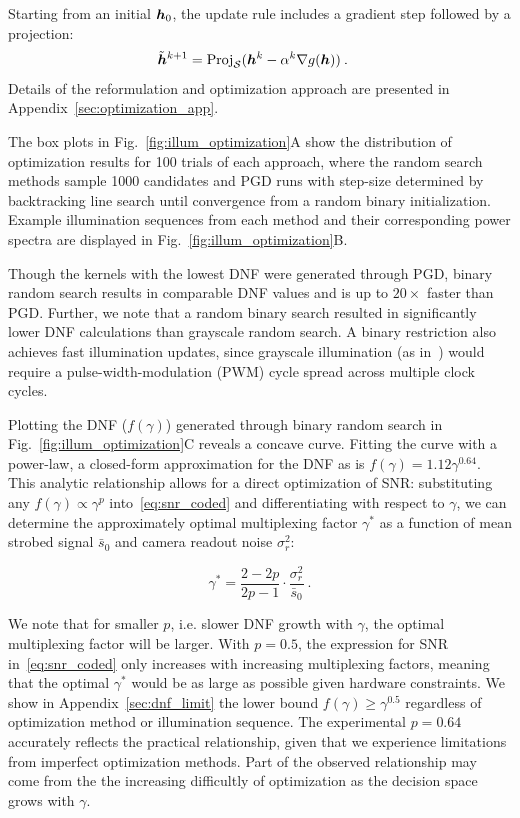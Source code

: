 Starting from an initial $\bm{h}_0$, the update rule includes a gradient step followed by a projection:
\begin{align*}
    \tilde {\bm{h}}^{k+1} &= \mathrm{Proj}_{\mathcal{S}}(\bm{h}^k - \alpha^k \nabla g(\bm{h}))\:.
\end{align*} 
Details of the reformulation and optimization approach are presented in Appendix~\ref{sec:optimization_app}.

The box plots in Fig.~\ref{fig:illum_optimization}A show the distribution of optimization results for 100 trials of each approach, where the random search methods sample 1000 candidates and PGD runs with step-size determined by backtracking line search until convergence from a random binary initialization. Example illumination sequences from each method and their corresponding power spectra are displayed in Fig.~\ref{fig:illum_optimization}B.

Though the kernels with the lowest DNF were generated through PGD, binary random search results in comparable DNF values and is up to $20\times$ faster than PGD. Further, we note that a random binary search resulted in significantly lower DNF calculations than grayscale random search. A binary restriction also achieves fast illumination updates, since grayscale illumination (as in~\cite{Ma:15}) would require a pulse-width-modulation (PWM) cycle spread across multiple clock cycles.  

Plotting the DNF ($f(\gamma)$) generated through binary random search in Fig.~\ref{fig:illum_optimization}C reveals a concave curve. Fitting the curve with a power-law, a closed-form approximation for the DNF as is $f(\gamma)=1.12\gamma^{0.64}$. This analytic relationship allows for a direct optimization of SNR: substituting any $f(\gamma) \propto \gamma^p$ into~\eqref{eq:snr_coded} and differentiating with respect to $\gamma$, we can determine the approximately optimal multiplexing factor $\gamma^*$ as a function of mean strobed signal $\bar{s}_0$ and camera readout noise $\sigma_r^2$:

\begin{equation}
    \label{eq:optimal_gamma}
    \gamma^* = \frac{2-2p}{2p-1} \cdot \frac{\sigma_r^2}{\bar{s}_0}\:.
\end{equation}

We note that for smaller $p$, i.e. slower DNF growth with $\gamma$, the optimal multiplexing factor will be larger. 
With $p=0.5$, the expression for SNR in~\eqref{eq:snr_coded} only increases with increasing multiplexing factors, meaning that the optimal $\gamma^*$ would be as large as possible given hardware constraints. 
We show in Appendix~\ref{sec:dnf_limit} the lower bound $f(\gamma)\geq \gamma^{0.5}$ regardless of optimization method or illumination sequence.
The experimental $p=0.64$ accurately reflects the practical relationship, given that we experience limitations from imperfect optimization methods. Part of the observed relationship may come from the the increasing difficultly of optimization as the decision space grows with $\gamma$. 

